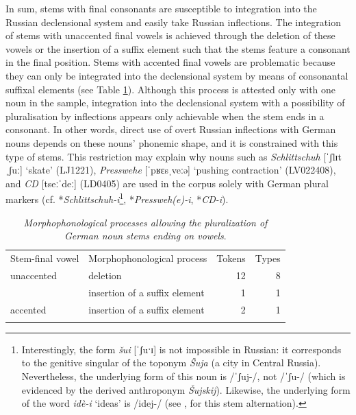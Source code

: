 In sum, stems with final consonants are susceptible to integration into the Russian declensional system and easily take Russian inflections. The integration of stems with unaccented final vowels is achieved through the deletion of these vowels or the insertion of a suffix element such that the stems feature a consonant in the final position. Stems with accented final vowels are problematic because they can only be integrated into the declensional system by means of consonantal suffixal elements (see Table \ref{tab:6:4}). Although this process is attested only with one noun in the sample, integration into the declensional system with a possibility of pluralisation by inflections appears only achievable when the stem ends in a consonant. In other words, direct use of overt Russian inflections with German nouns depends on these nouns’ phonemic shape, and it is constrained with this type of stems. This restriction may explain why nouns such as \textit{Schlittschuh} [ˈʃlɪtˌʃuː] `skate' (LJ1221), \textit{Presswehe} [ˈpʁɛsˌveːə] `pushing contraction' (LV022408), and \textit{CD} [tseːˈdeː] (LD0405) are used in the corpus solely with German plural markers (cf. *\textit{Schlittschuh-i}\footnote{
	Interestingly, the form \textit{šui} [ˈʃuˑɪ] is not impossible in Russian: it corresponds to the genitive singular of the toponym \textit{Šuja} (a city in Central Russia). Nevertheless, the underlying form of this noun is /ˈʃuj-/, not /ˈʃu-/ (which is evidenced by the derived anthroponym \textit{Šujskij}). Likewise, the underlying form of the word \textit{idè-i} `ideas' is /idej-/ (see \citealt[246]{itkin_2007}, for this stem alternation).}, *\textit{Pressweh(e)-i}, *\textit{CD-i}).

\begin{table}
\begin{tabularx}{\textwidth}{ll@{\hskip 30pt}r@{\hskip 30pt}r}
\midrule \addlinespace[2mm]
	Stem-final vowel & Morphophonological process & Tokens & Types\\ \addlinespace[2mm] \midrule \addlinespace[2mm]
	unaccented & deletion & 12 & 8\\
	& insertion of a suffix element & 1 & 1\\ \addlinespace[2mm] \midrule \addlinespace[2mm]
	accented & insertion of a suffix element & 2 & 1\\ \addlinespace[2mm] \midrule
	\end{tabularx}
	\caption{\textit{Morphophonological processes allowing the pluralization of German noun stems ending on vowels}.}
\label{tab:6:4}
\end{table}


